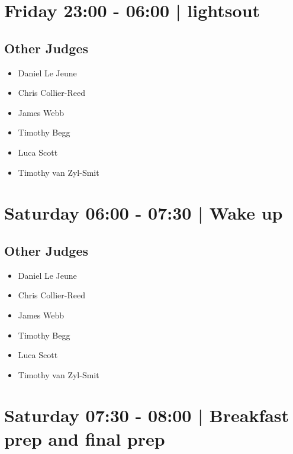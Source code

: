 \documentclass[10pt, A5]{article}
\begin{document}
            \section*{Friday 23:00
        -
        06:00
        |
         lightsout}
        
                
        \subsection*{Other Judges}
        
            \begin{itemize}
                            \item Daniel Le Jeune
                            \item Chris Collier-Reed
                            \item James Webb
                            \item Timothy Begg
                            \item Luca Scott
                            \item Timothy van Zyl-Smit
                        \end{itemize}
        

            \section*{Saturday 06:00
        -
        07:30
        |
         Wake up}
        
                
        \subsection*{Other Judges}
        
            \begin{itemize}
                            \item Daniel Le Jeune
                            \item Chris Collier-Reed
                            \item James Webb
                            \item Timothy Begg
                            \item Luca Scott
                            \item Timothy van Zyl-Smit
                        \end{itemize}
        

            \section*{Saturday 07:30
        -
        08:00
        |
         Breakfast prep and final prep}
        
\end{document}
